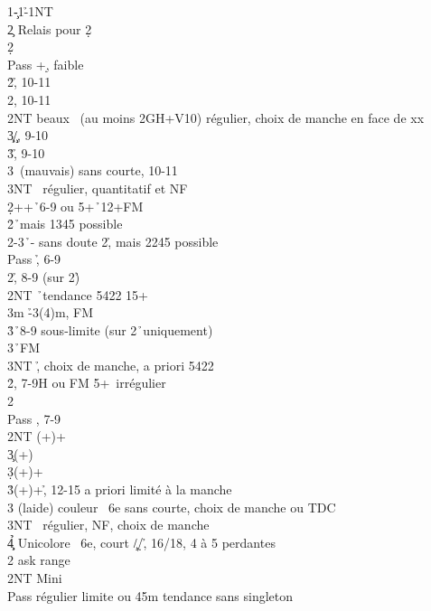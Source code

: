 \documentclass[a4paper]{article}
\begin{document}
\begin{bidtable}
1\c-1\h-1NT\+\\
2\c \> Relais pour 2\d \+\\
2\d\+\\
Pass +\d , faible\\
2\h {}\h , 10-11\\
2\s {}\s , 10-11\\
2NT  beaux \s\ (au moins 2GH+V10) régulier, choix de manche en face de xx\\
3\c\d {}\c /\d , 9-10\\
3\h {}\h , 9-10\\
3\s {}\s\ (mauvais) sans courte, 10-11\\
3NT \s\ régulier, quantitatif et NF\-\-\\
2\d {}++\h\ 6-9 ou 5+\h\ 12+FM\+\\
2\h {}\h\ mais 1345 possible\\
2\s {}-3\h\ - sans doute 2\h , mais 2245 possible\+\\
Pass \h , 6-9\\
2\s {}\h , 8-9 (sur 2\h )\\
2NT \h\ tendance 5422 15+\\
3m \h -3(4)m, FM\\
3\h {}\h\ 8-9 sous-limite (sur 2\h\ uniquement)\\
3\s {}\h\ FM\\
3NT \h , choix de manche, a priori 5422\-\-\\
2\h {}\s , 7-9H ou FM 5+\s\ irrégulier\+\\
2\s\+\\
Pass \s , 7-9\\
2NT (+)+\c \\
3\c {}(+)\d \\
3\d {}(+)+\d \\
3\h {}(+)+\h , 12-15 a priori limité à la manche\\
3\s \> (laide) couleur \s\ 6e sans courte, choix de manche ou TDC\\
3NT \s\ régulier, NF, choix de manche\\
4\c\d\h \> Unicolore \s\ 6e, court \c /\d /\h , 16/18, 4 à 5 perdantes\-\-\\
2\s \> ask range\+\\
2NT \> Mini\+\\
Pass \> régulier limite ou 4\s 5m tendance sans singleton\\

\end{bidtable}
\end{document}
